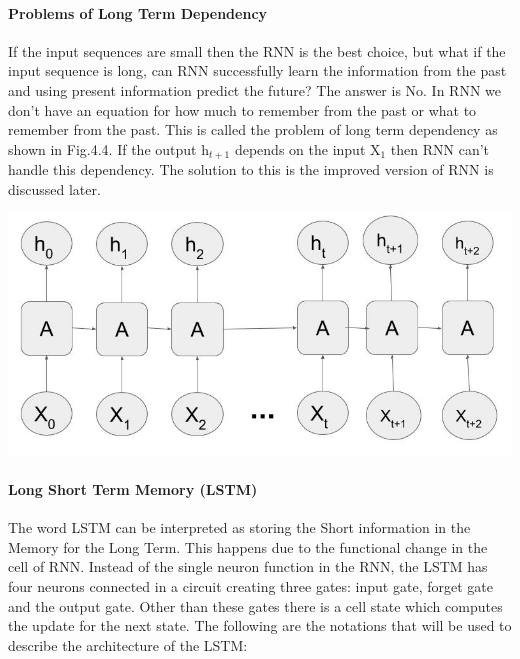 \paragraph{Problems of Long Term Dependency}

If the input sequences are small then the RNN is the best choice, but what if the input sequence is long, can RNN successfully learn the information from the past and using present information predict the future? The answer is No. In RNN we don’t have an equation for how much to remember from the past or what to remember from the past. This is called the problem of long term dependency \cite{12} as shown in Fig.4.4. If the output h$_{t+1}$ depends on the input X$_{1}$ then RNN can’t handle this dependency. The solution to this is the improved version of RNN is discussed later.

				\begin{center}
				\includegraphics[width=\linewidth]{figures/Problem-of-Long-Term-Dependency.jpg}	
				\label{fig: Long term dependency problem}
				\end{center}



\paragraph{Long Short Term Memory (LSTM)}

The word LSTM \cite{12} can be interpreted as storing the Short information in the Memory for the Long Term. This happens due to the functional change in the cell of RNN. Instead of the single neuron function in the RNN, the LSTM has four neurons connected in a circuit creating three gates: input gate, forget gate and the output gate. Other than these gates there is a cell state which computes the update for the next state. The following are the notations that will be used to describe the architecture of the LSTM:

